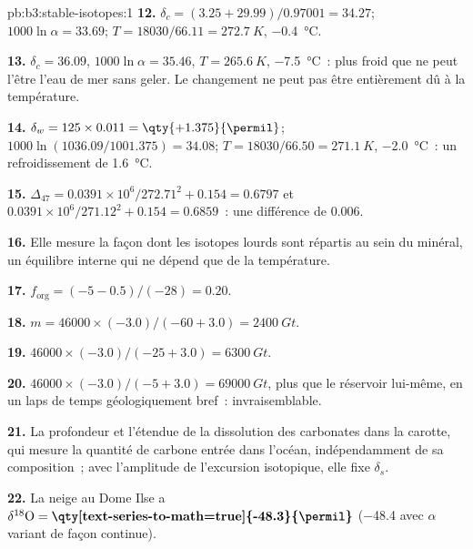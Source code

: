 \begin{solution}{pb:b3:stable-isotopes:1}
\textbf{12.} $\delta_c = (3.25 + 29.99)/0.97001 = 34.27$; $1000\ln\alpha =
33.69$; $T = 18030/66.11 = \qty{272.7}{K}$, \qty{-0.4}{\celsius}.

\textbf{13.} $\delta_c = 36.09$, $1000\ln\alpha = 35.46$, $T = \qty{265.6}{K}$,
\qty{-7.5}{\celsius}~: plus froid que ne peut l'être l'eau de mer sans geler. Le
changement ne peut pas être entièrement dû à la température.

\textbf{14.} $\delta_w = 125\times0.011 = \qty{+1.375}{\permil}$; $1000\ln(1036.09/1001.375)
= 34.08$; $T = 18030/66.50 = \qty{271.1}{K}$, \qty{-2.0}{\celsius}~: un refroidissement de
\qty{1.6}{\celsius}.

\textbf{15.} $\Delta_{47} = 0.0391\times10^6/272.71^2 + 0.154 = 0.6797$ et
$0.0391\times10^6/271.12^2 + 0.154 = 0.6859$~: une différence de
\qty{0.006}{\permil}.

\textbf{16.} Elle mesure la façon dont les isotopes lourds sont répartis au sein du
minéral, un équilibre interne qui ne dépend que de la température.

\textbf{17.} $f_{\mathrm{org}} = (-5 - 0.5)/(-28) = 0.20$.

\textbf{18.} $m = 46000\times(-3.0)/(-60 + 3.0) = \qty{2400}{Gt}$.

\textbf{19.} $46000\times(-3.0)/(-25 + 3.0) = \qty{6300}{Gt}$.

\textbf{20.} $46000\times(-3.0)/(-5 + 3.0) = \qty{69000}{Gt}$, plus que le
réservoir lui-même, en un laps de temps géologiquement bref~: invraisemblable.

\textbf{21.} La profondeur et l'étendue de la dissolution des carbonates dans la carotte, qui
mesure la quantité de carbone entrée dans l'océan, indépendamment de sa composition~;
avec l'amplitude de l'excursion isotopique, elle fixe $\delta_s$.

\textbf{22.} La neige au Dome Ilse a $\delta^{18}\mathrm O =
\textbf{\qty[text-series-to-math=true]{-48.3}{\permil}} $ (\qty{-48.4}{\permil}
avec $\alpha$ variant de façon continue).
\end{solution}
